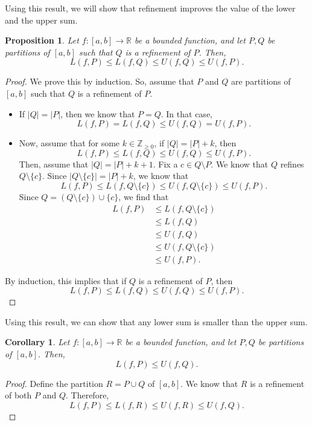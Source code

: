 \documentclass[a4paper, openany]{memoir}
\theoremstyle{definition}
\theoremstyle{plain}
\newtheorem{proposition}[definition]{Proposition}
\newtheorem{corollary}[definition]{Corollary}
\begin{document}
\noindent Using this result, we will show that refinement improves the value of the lower and the upper sum.
\begin{proposition}
Let $f: [a, b] \to \mathbb{R}$ be a bounded function, and let $P, Q$ be partitions of $[a, b]$ such that $Q$ is a refinement of $P$. Then,
\[L(f, P) \leqslant L(f, Q) \leqslant U(f, Q) \leqslant U(f, P).\]
\end{proposition}
\begin{proof}
We prove this by induction. So, assume that $P$ and $Q$ are partitions of $[a, b]$ such that $Q$ is a refinement of $P$.
\begin{itemize}
    \item If $|Q| = |P|$, then we know that $P = Q$. In that case,
    \[L(f, P) = L(f, Q) \leqslant U(f, Q) = U(f, P).\]
    
    \item Now, assume that for some $k \in \mathbb{Z}_{\geqslant 0}$, if $|Q| = |P| + k$, then
    \[L(f, P) \leqslant L(f, Q) \leqslant U(f, Q) \leqslant U(f, P).\]
    Then, assume that $|Q| = |P| + k+1$. Fix a $c \in Q \setminus P$. We know that $Q$ refines $Q \setminus \{c\}$. Since $|Q \setminus \{c\}| = |P| + k$, we know that
    \[L(f, P) \leqslant L(f, Q \setminus \{c\}) \leqslant U(f, Q \setminus \{c\}) \leqslant U(f, P).\]
    Since $Q = (Q \setminus \{c\}) \cup \{c\}$, we find that
    \begin{align*}
        L(f, P) &\leqslant L(f, Q \setminus \{c\}) \\
        &\leqslant L(f, Q) \\
        &\leqslant U(f, Q) \\
        &\leqslant U(f, Q \setminus \{c\}) \\
        &\leqslant U(f, P).
    \end{align*}
\end{itemize}
By induction, this implies that if $Q$ is a refinement of $P$, then
\[L(f, P) \leqslant L(f, Q) \leqslant U(f, Q) \leqslant U(f, P).\]
\end{proof}
\noindent Using this result, we can show that any lower sum is smaller than the upper sum.
\begin{corollary}
Let $f: [a, b] \to \mathbb{R}$ be a bounded function, and let $P, Q$ be partitions of $[a, b]$. Then,
\[L(f, P) \leqslant U(f, Q).\]
\end{corollary}
\begin{proof}
Define the partition $R = P \cup Q$ of $[a, b]$. We know that $R$ is a refinement of both $P$ and $Q$. Therefore, 
\[L(f, P) \leqslant L(f, R) \leqslant U(f, R) \leqslant U(f, Q).\]
\end{proof}
\end{document}
